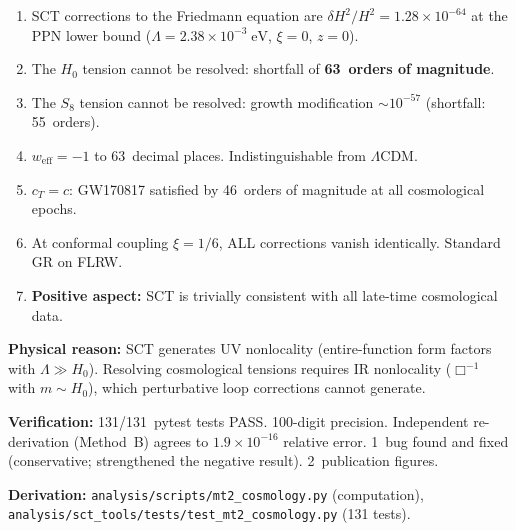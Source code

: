 \documentclass[11pt,a4paper]{article}
\newcommand{\Lam}{\Lambda}
\theoremstyle{plain}
\theoremstyle{definition}
\begin{document}
\begin{tcolorbox}[colback=blue!5!white, colframe=blue!50!black,
  title={\textbf{MT-2 Main Results (NEGATIVE)}}]
\begin{enumerate}[nosep]
  \item SCT corrections to the Friedmann equation are
    $\delta H^2/H^2 = 1.28 \times 10^{-64}$ at the PPN lower bound
    ($\Lam = 2.38 \times 10^{-3}\;\mathrm{eV}$, $\xi = 0$, $z = 0$).

  \item The $H_0$ tension cannot be resolved: shortfall of
    \textbf{63~orders of magnitude}.

  \item The $S_8$ tension cannot be resolved: growth modification
    $\sim 10^{-57}$ (shortfall: 55~orders).

  \item $w_{\mathrm{eff}} = -1$ to 63~decimal places.
    Indistinguishable from $\Lam$CDM.

  \item $c_T = c$: GW170817 satisfied by 46~orders of magnitude
    at all cosmological epochs.

  \item At conformal coupling $\xi = 1/6$, ALL corrections vanish
    identically. Standard GR on FLRW.

  \item \textbf{Positive aspect:} SCT is trivially consistent with
    all late-time cosmological data.
\end{enumerate}

\medskip
\noindent\textbf{Physical reason:} SCT generates UV nonlocality
(entire-function form factors with $\Lam \gg H_0$). Resolving
cosmological tensions requires IR nonlocality ($\Box^{-1}$ with
$m \sim H_0$), which perturbative loop corrections cannot generate.

\medskip
\noindent\textbf{Verification:} 131/131~pytest tests PASS.
100-digit precision. Independent re-derivation (Method~B) agrees to
$1.9 \times 10^{-16}$ relative error. 1~bug found and fixed
(conservative; strengthened the negative result). 2~publication figures.

\medskip
\noindent\textbf{Derivation:}
\texttt{analysis/scripts/mt2\_cosmology.py} (computation),
\texttt{analysis/sct\_tools/tests/test\_mt2\_cosmology.py} (131 tests).
\end{tcolorbox}
\end{document}
